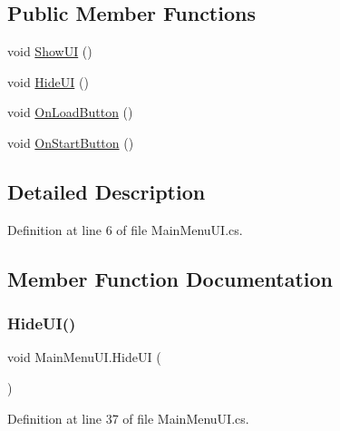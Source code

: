 \subsection*{Public Member Functions}
\begin{DoxyCompactItemize}
\item 
void \mbox{\hyperlink{class_main_menu_u_i_ab70d817a22e65d2258cfd0d9a48404a8}{Show\+UI}} ()
\item 
void \mbox{\hyperlink{class_main_menu_u_i_a880a33ba6d600fee9ee4635b94bded8c}{Hide\+UI}} ()
\item 
void \mbox{\hyperlink{class_main_menu_u_i_ab97fc6c28c9bfe985c650c7572aec0fc}{On\+Load\+Button}} ()
\item 
void \mbox{\hyperlink{class_main_menu_u_i_ac567ba394028f00989750f4782325daf}{On\+Start\+Button}} ()
\end{DoxyCompactItemize}


\subsection{Detailed Description}


Definition at line 6 of file Main\+Menu\+U\+I.\+cs.



\subsection{Member Function Documentation}
\mbox{\label{class_main_menu_u_i_a880a33ba6d600fee9ee4635b94bded8c}} 
\subsubsection{\texorpdfstring{HideUI()}{HideUI()}}
{\footnotesize\ttfamily void Main\+Menu\+U\+I.\+Hide\+UI (\begin{DoxyParamCaption}{ }\end{DoxyParamCaption})}



Definition at line 37 of file Main\+Menu\+U\+I.\+cs.

